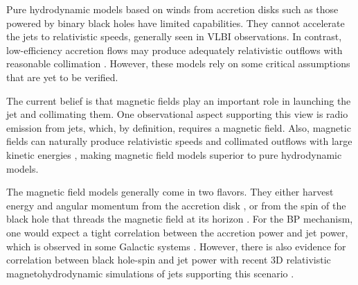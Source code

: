 Pure hydrodynamic models based on winds from accretion disks such as those powered by binary black holes \citep[e.g.,][]{1973A&A....24..337S} have limited capabilities. They cannot accelerate the jets to relativistic speeds, generally seen in VLBI observations. In contrast, low-efficiency accretion flows may produce adequately relativistic outflows with reasonable collimation \citep{rees1982ion,das1998observational}. However, these models rely on some critical assumptions that are yet to be verified.

The current belief is that magnetic fields play an important role in launching the jet and collimating them. One observational aspect supporting this view is radio emission from jets, which, by definition, requires a magnetic field. Also, magnetic fields can naturally produce relativistic speeds and collimated outflows with large kinetic energies \citep[e.g.,][]{heinz2000jet}, making magnetic field models superior to pure hydrodynamic models. 

The magnetic field models generally come in two flavors. They either harvest energy and angular momentum from the accretion disk \citep[e.g.,][BP]{blandford1982hydromagnetic}, or from the spin of the black hole that threads the magnetic field at its horizon \citep[e.g.,][BZ]{blandford1977electromagnetic}. For the BP mechanism, one would expect a tight correlation between the accretion power and jet power, which is observed in some Galactic systems \citep[e.g.,][]{willott1999emission}. However, there is also evidence for correlation between black hole-spin and  jet power \citep[e.g.,][]{mcclintock2013black} with recent 3D relativistic magnetohydrodynamic simulations of jets supporting this scenario \citep{mckinney2006general,tchekhovskoy2011efficient,marti2019numerical}.


